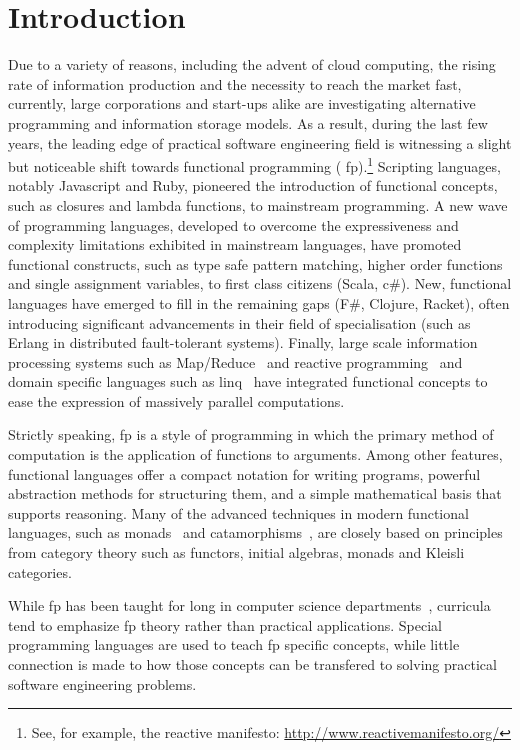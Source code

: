 \documentclass[conference]{sig-alternate}
\begin{document}
\section{Introduction}

Due to a variety of reasons, including the advent of cloud computing, the rising
rate of information production and the necessity to reach the market fast,
currently, large corporations and start-ups alike are investigating alternative
programming and information storage models. As a result, during the last few
years, the leading edge of practical software engineering field is witnessing a
slight but noticeable shift towards functional programming ({\sc
fp}).\footnote{See, for example, the reactive manifesto:
\href{http://www.reactivemanifesto.org/}{http://www.reactivemanifesto.org/}}
Scripting languages, notably Javascript and Ruby, pioneered the introduction of
functional concepts, such as closures and lambda functions, to mainstream
programming. A new wave of programming languages, developed to overcome the
expressiveness and complexity limitations exhibited in mainstream languages,
have promoted functional constructs, such as type safe pattern matching, higher
order functions and single assignment variables, to first class citizens (Scala,
{\sc c\#}).  New, functional languages have emerged to fill in the remaining
gaps (F\#, Clojure, Racket), often introducing significant advancements in their
field of specialisation (such as Erlang in distributed fault-tolerant systems).
Finally, large scale information processing systems such as
Map/Reduce~\cite{Dean04} and reactive programming~\cite{Meije12} and domain
specific languages such as {\sc linq}~\cite{Meije11} have integrated functional
concepts to ease the expression of massively parallel computations.

Strictly speaking, {\sc fp} is a style of programming in which the primary
method of computation is the application of functions to arguments.  Among other
features, functional languages offer a compact notation for writing programs,
powerful abstraction methods for structuring them, and a simple mathematical
basis that supports reasoning. Many of the advanced techniques in modern
functional languages, such as monads~\cite{Wadle93} and
catamorphisms~\cite{Meije91}, are closely based on principles from category
theory such as functors, initial algebras, monads and Kleisli categories.

While {\sc fp} has been taught for long in computer science
departments~\cite{Joost93}, curricula tend to emphasize {\sc fp} theory rather than practical applications. Special programming languages are
used to teach {\sc fp} specific concepts, while little connection
is made to how those concepts can be transfered to solving practical software
engineering problems.
\end{document}
